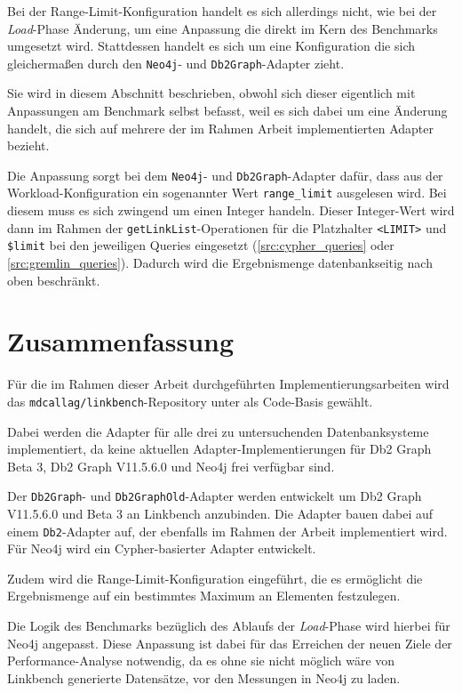 Bei der Range-Limit-Konfiguration handelt es sich allerdings nicht, wie bei der \textit{Load}-Phase Änderung, um eine Anpassung die direkt im Kern des Benchmarks umgesetzt wird. Stattdessen handelt es sich um eine Konfiguration die sich gleichermaßen durch den \texttt{Neo4j}- und \texttt{Db2Graph}-Adapter zieht. 

Sie wird in diesem Abschnitt beschrieben, obwohl sich dieser eigentlich mit Anpassungen am Benchmark selbst befasst, weil es sich dabei um eine Änderung handelt, die sich auf mehrere der im Rahmen Arbeit implementierten Adapter bezieht.

Die Anpassung sorgt bei dem \texttt{Neo4j}- und \texttt{Db2Graph}-Adapter dafür, dass aus der Workload-Konfiguration ein sogenannter Wert \texttt{range\_limit} ausgelesen wird. Bei diesem muss es sich zwingend um einen Integer handeln. Dieser Integer-Wert wird dann im Rahmen der \texttt{getLinkList}-Ope\-ra\-ti\-on\-en für die Platzhalter \texttt{<LIMIT>} und \texttt{\$limit} bei den jeweiligen Queries eingesetzt (\autoref{src:cypher_queries} oder \autoref{src:gremlin_queries}). Dadurch wird die Ergebnismenge datenbankseitig nach oben beschränkt. 

\section{Zusammenfassung}
\label{implementierung:zusammenfassung}
Für die im Rahmen dieser Arbeit durchgeführten Implementierungsarbeiten wird das \texttt{mdcallag/linkbench}-Repository unter \cite{mc_linkbench_github} als Code-Basis gewählt.

Dabei werden die Adapter für alle drei zu untersuchenden Datenbanksysteme implementiert, da keine aktuellen Adapter-Implementierungen für Db2 Graph Beta 3, Db2 Graph V11.5.6.0 und Neo4j frei verfügbar sind.

Der \texttt{Db2Graph}- und \texttt{Db2GraphOld}-Adapter werden entwickelt um Db2 Graph V11.5.6.0 und Beta 3 an Linkbench anzubinden. Die Adapter bauen dabei auf einem \texttt{Db2}-Adapter auf, der ebenfalls im Rahmen der Arbeit implementiert wird. Für Neo4j wird ein Cypher-basierter Adapter entwickelt. 

Zudem wird die Range-Limit-Konfiguration eingeführt, die es ermöglicht die Ergebnismenge auf ein bestimmtes Maximum an Elementen festzulegen. 

Die Logik des Benchmarks bezüglich des Ablaufs der \textit{Load}-Phase wird hierbei für Neo4j angepasst. Diese Anpassung ist dabei für das Erreichen der neuen Ziele der Performance-Analyse notwendig, da es ohne sie nicht möglich wäre von Linkbench generierte Datensätze, vor den Messungen in Neo4j zu laden. 